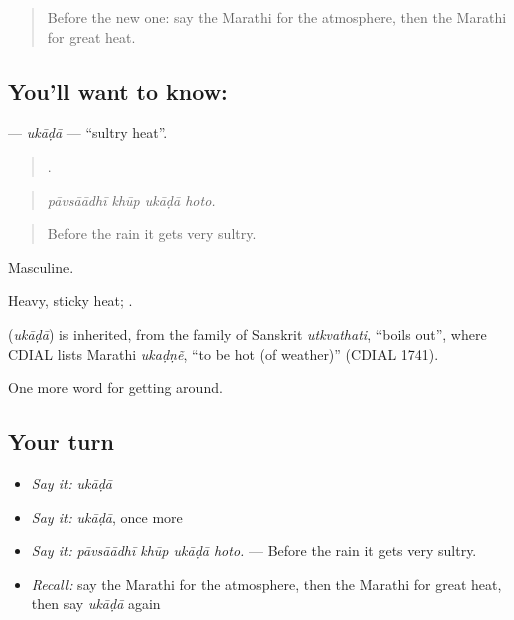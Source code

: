 \label{lesson:MR-C436-ukada}



\begin{quote}
Before the new one: say the Marathi for the atmosphere, then the Marathi for great heat.
\end{quote}

\subsection*{You'll want to know: }
\textbf{} — \emph{ukāḍā} — \textquotedblleft{}sultry heat\textquotedblright{}.

\begin{quote}
   .
\end{quote}

\begin{quote}
\emph{pāvsāādhī khūp ukāḍā hoto.}
\end{quote}

\begin{quote}
Before the rain it gets very sultry.
\end{quote}

Masculine.

Heavy, sticky heat;  .

\begin{cousinweb}
\textbf{} (\emph{ukāḍā}) is inherited, from the family of Sanskrit \emph{utkvathati}, \textquotedblleft{}boils out\textquotedblright{}, where CDIAL lists Marathi \emph{ukaḍṇẽ}, \textquotedblleft{}to be hot (of weather)\textquotedblright{} (CDIAL 1741).
\end{cousinweb}

\begin{grammarlens}[title={What you've built}]
One more word for getting around.
\end{grammarlens}

\subsection*{Your turn}
\begin{itemize}
\raggedright
  \item \emph{Say it:} \emph{ukāḍā}
  \item \emph{Say it:} \emph{ukāḍā}, once more
  \item \emph{Say it:} \emph{pāvsāādhī khūp ukāḍā hoto.} — Before the rain it gets very sultry.
  \item \emph{Recall:} say the Marathi for the atmosphere, then the Marathi for great heat, then say \emph{ukāḍā} again
\end{itemize}

